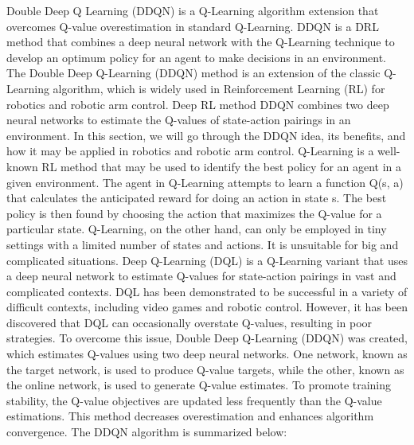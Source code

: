 \documentclass[12pt,oneside]{article}
\begin{document}
Double Deep Q Learning (DDQN) \cite{42_hamdia2021efficient} is a Q-Learning algorithm extension that overcomes Q-value overestimation in standard Q-Learning. DDQN is a DRL method that combines a deep neural network with the Q-Learning technique to develop an optimum policy for an agent to make decisions in an environment.
The Double Deep Q-Learning (DDQN) method is an extension of the classic Q-Learning algorithm, which is widely used in Reinforcement Learning (RL) for robotics and robotic arm control. Deep RL method DDQN combines two deep neural networks to estimate the Q-values of state-action pairings in an environment. In this section, we will go through the DDQN idea, its benefits, and how it may be applied in robotics and robotic arm control.
Q-Learning is a well-known RL method that may be used to identify the best policy for an agent in a given environment. The agent in Q-Learning attempts to learn a function Q(s, a) that calculates the anticipated reward for doing an action in state s. The best policy is then found by choosing the action that maximizes the Q-value for a particular state. Q-Learning, on the other hand, can only be employed in tiny settings with a limited number of states and actions. It is unsuitable for big and complicated situations.
Deep Q-Learning (DQL) is a Q-Learning variant that uses a deep neural network to estimate Q-values for state-action pairings in vast and complicated contexts. DQL has been demonstrated to be successful in a variety of difficult contexts, including video games and robotic control. However, it has been discovered that DQL can occasionally overstate Q-values, resulting in poor strategies.
To overcome this issue, Double Deep Q-Learning (DDQN) was created, which estimates Q-values using two deep neural networks. One network, known as the target network, is used to produce Q-value targets, while the other, known as the online network, is used to generate Q-value estimates. To promote training stability, the Q-value objectives are updated less frequently than the Q-value estimations. This method decreases overestimation and enhances algorithm convergence.
The DDQN algorithm is summarized below:
\end{document}
